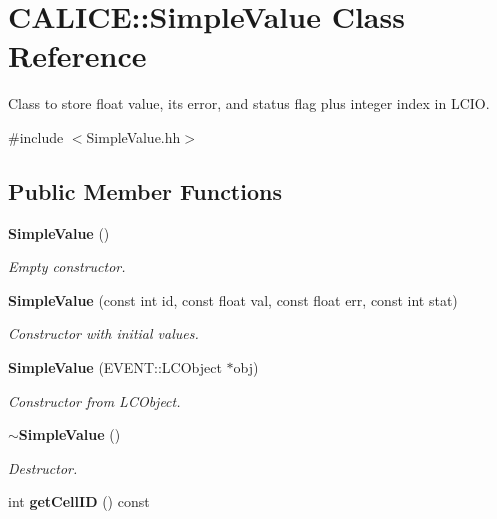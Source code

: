 \section{CALICE::SimpleValue Class Reference}
\label{classCALICE_1_1SimpleValue}


Class to store float value, its error, and status flag plus integer index in LCIO.  


{\ttfamily \#include $<$SimpleValue.hh$>$}\subsection*{Public Member Functions}
\begin{DoxyCompactItemize}
\item 
{\bf SimpleValue} ()\label{classCALICE_1_1SimpleValue_ab63afbd0e34d1f5de34ba7f0301f6f84}

\begin{DoxyCompactList}\small\item\em Empty constructor. \item\end{DoxyCompactList}\item 
{\bf SimpleValue} (const int id, const float val, const float err, const int stat)\label{classCALICE_1_1SimpleValue_ae5c7759090b4235eddfed2ea6b977e40}

\begin{DoxyCompactList}\small\item\em Constructor with initial values. \item\end{DoxyCompactList}\item 
{\bf SimpleValue} (EVENT::LCObject $\ast$obj)\label{classCALICE_1_1SimpleValue_a3d8634f99881f9481572b16a5e2bffda}

\begin{DoxyCompactList}\small\item\em Constructor from LCObject. \item\end{DoxyCompactList}\item 
{\bf $\sim$SimpleValue} ()\label{classCALICE_1_1SimpleValue_a9027e479b382b6a6e9371a4dff09bdaa}

\begin{DoxyCompactList}\small\item\em Destructor. \item\end{DoxyCompactList}\item 
int {\bf getCellID} () const \label{classCALICE_1_1SimpleValue_a9cb25f2d1419faa25ee60ee6969088f2}


\end{DoxyCompactItemize}
